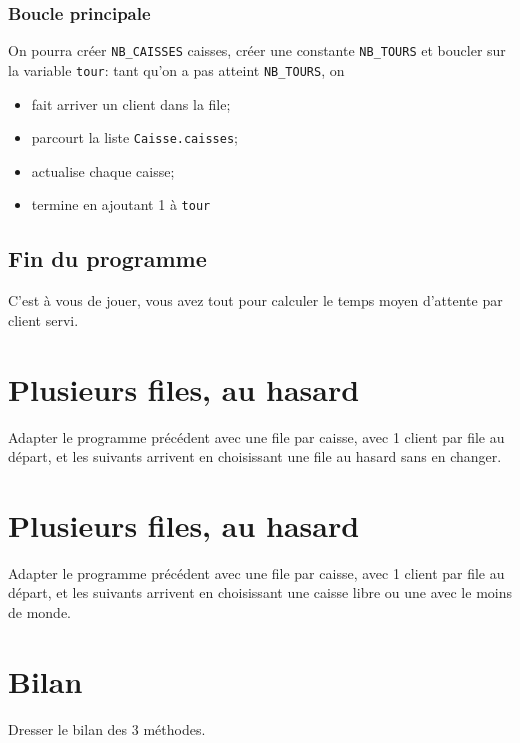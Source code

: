 \documentclass[12pt,firamath,article]{nsi}
\begin{document}
\begin{itemize}
\subsubsection*{Boucle principale}
On pourra créer \texttt{NB_CAISSES} caisses, créer une constante \texttt{NB_TOURS} et boucler sur la variable \texttt{tour}: tant qu'on a pas atteint  \texttt{NB_TOURS}, on
\begin{itemize}
\item fait arriver un client dans la file;
\item parcourt la liste \texttt{Caisse.caisses};
\item actualise chaque caisse;
\item termine en ajoutant 1 à \texttt{tour}
\end{itemize}
\subsection*{Fin du programme}
C'est à vous de jouer, vous avez tout pour calculer le temps moyen d'attente par client servi.
\end{itemize}

\section*{Plusieurs files, au hasard}
Adapter le programme précédent avec une file par caisse, avec 1 client par file au départ, et les suivants arrivent en choisissant une file au hasard sans en changer.

\section*{Plusieurs files, au hasard}
Adapter le programme précédent avec une file par caisse, avec 1 client par file au départ, et les suivants arrivent en choisissant une caisse libre ou une avec le moins de monde.

\section*{Bilan}
Dresser le bilan des 3 méthodes.
\end{document}
